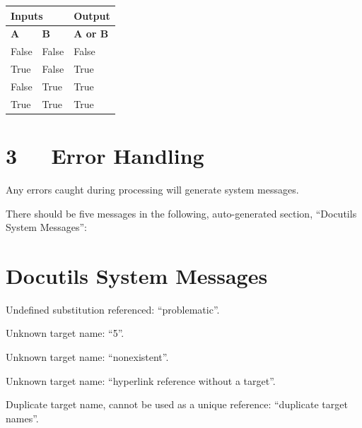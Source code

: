 \documentclass[10pt,english]{article}
\newlength{\locallinewidth}
\begin{document}
\begin{longtable}[c]{|p{0.07\locallinewidth}|p{0.07\locallinewidth}|p{0.09\locallinewidth}|}
\hline
\multicolumn{2}{|l|}{\textbf{
Inputs
}} & \textbf{
Output
} \\
\hline
\textbf{
A
} & \textbf{
B
} & \textbf{
A or B
} \\
\hline
\endhead

False
 & 
False
 & 
False
 \\
\hline

True
 & 
False
 & 
True
 \\
\hline

False
 & 
True
 & 
True
 \\
\hline

True
 & 
True
 & 
True
 \\
\hline
\end{longtable}



\hypertarget{error-handling}{}
\section*{3~~~Error Handling}

Any errors caught during processing will generate system messages.

There should be five messages in the following, auto-generated
section, ``Docutils System Messages'':



\section*{Docutils System Messages}

Undefined substitution referenced: ``problematic''.


Unknown target name: ``5''.


Unknown target name: ``nonexistent''.


Unknown target name: ``hyperlink reference without a target''.


Duplicate target name, cannot be used as a unique reference: ``duplicate target names''.
\end{document}
